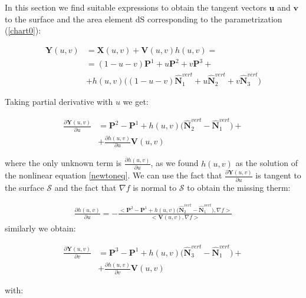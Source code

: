 \documentclass[11pt]{article}
\newcommand\bP{\boldsymbol P}
\newcommand\bN{\boldsymbol N}
\newcommand\bX{\boldsymbol X}
\newcommand\bY{\boldsymbol Y}
\newcommand\bV{\boldsymbol V}
\newcommand\bu{\boldsymbol u}
\newcommand\bv{\boldsymbol v}
\begin{document}
In this section we find suitable expressions to obtain the tangent
vectors $\bu$ and $\bv$ to the surface and the area element dS
corresponding to the parametrization (\ref{chart0}):

\begin{equation}\label{chart}
\begin{aligned}
\bY(u,v)&=\bX(u,v)+\bV(u,v)h(u,v)=\\
&=(1-u-v)\bP^1+u\bP^2+v\bP^3+\\
&+h(u,v)\Big((1-u-v)\hat{\bN}^{vert}_1+u\hat{\bN}^{vert}_2+v\hat{\bN}^{vert}_3\Big)
\end{aligned}
\end{equation}

Taking partial derivative with $u$ we get:

\begin{equation}\label{U_vector}
\begin{aligned}
\frac{\partial\bY(u,v)}{\partial u}&=\bP^2-\bP^1+h(u,v)\Big(\hat{\bN}^{vert}_2-\hat{\bN}^{vert}_1\Big)+\\
&+\frac{\partial h(u,v)}{\partial u}\bV(u,v)
\end{aligned}
\end{equation}

where the only unknown term is $\frac{\partial h(u,v)}{\partial u}$, as we found $h(u,v)$ as the solution of the nonlinear equation \ref{newtoneq}. We can use the fact that $\frac{\partial\bY(u,v)}{\partial u}$ is tangent to the surface $\mathcal{S}$ and the fact that $\nabla f$ is normal to $\mathcal{S}$ to obtain the missing therm:

\begin{equation}\label{U_vector_2}
\begin{aligned}
\frac{\partial h(u,v)}{\partial u}=-\frac{<\bP^2-\bP^1+h(u,v)\Big(\hat{\bN}^{vert}_2-\hat{\bN}^{vert}_1\Big),\nabla f>}{<\bV(u,v),\nabla f>}
\end{aligned}
\end{equation}
similarly we obtain:

\begin{equation}\label{V_vector}
\begin{aligned}
\frac{\partial\bY(u,v)}{\partial v}&=\bP^3-\bP^1+h(u,v)\Big(\hat{\bN}^{vert}_3-\hat{\bN}^{vert}_1\Big)+\\
&+\frac{\partial h(u,v)}{\partial v}\bV(u,v)
\end{aligned}
\end{equation}

with:
\end{document}
